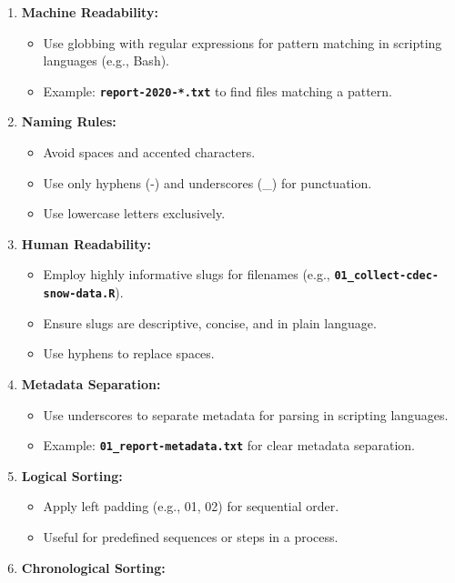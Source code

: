 \documentclass[
  letterpaper,
  DIV=11,
  numbers=noendperiod]{scrreprt}
\providecommand{\tightlist}{%
  \setlength{\itemsep}{0pt}\setlength{\parskip}{0pt}}\usepackage{longtable,booktabs,array}
\begin{document}
\begin{enumerate}
\def\labelenumi{\arabic{enumi}.}
\tightlist
\item
  \textbf{Machine Readability:}

  \begin{itemize}
  \tightlist
  \item
    Use globbing with regular expressions for pattern matching in
    scripting languages (e.g., Bash).
  \item
    Example: \textbf{\texttt{report-2020-*.txt}} to find files matching
    a pattern.
  \end{itemize}
\item
  \textbf{Naming Rules:}

  \begin{itemize}
  \tightlist
  \item
    Avoid spaces and accented characters.
  \item
    Use only hyphens (-) and underscores (\_) for punctuation.
  \item
    Use lowercase letters exclusively.
  \end{itemize}
\item
  \textbf{Human Readability:}

  \begin{itemize}
  \tightlist
  \item
    Employ highly informative slugs for filenames (e.g.,
    \textbf{\texttt{01\_collect-cdec-snow-data.R}}).
  \item
    Ensure slugs are descriptive, concise, and in plain language.
  \item
    Use hyphens to replace spaces.
  \end{itemize}
\item
  \textbf{Metadata Separation:}

  \begin{itemize}
  \tightlist
  \item
    Use underscores to separate metadata for parsing in scripting
    languages.
  \item
    Example: \textbf{\texttt{01\_report-metadata.txt}} for clear
    metadata separation.
  \end{itemize}
\item
  \textbf{Logical Sorting:}

  \begin{itemize}
  \tightlist
  \item
    Apply left padding (e.g., 01, 02) for sequential order.
  \item
    Useful for predefined sequences or steps in a process.
  \end{itemize}
\item
  \textbf{Chronological Sorting:}


\end{enumerate}
\end{document}
